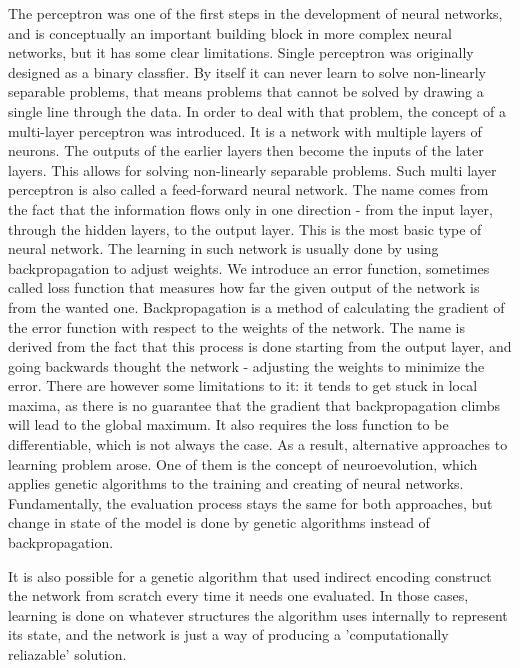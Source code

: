 \documentclass{article}
\begin{document}
The perceptron was one of the first steps in the development of neural networks, and is conceptually an important building block in more 
complex neural networks, but it has some clear limitations.
Single perceptron was originally designed as a binary classfier. 
By itself it can never learn to solve non-linearly
separable problems, that means problems that cannot be solved by drawing a single line through the data.
In order to deal with that problem, the concept of a multi-layer perceptron was introduced.
It is a network with multiple layers of neurons.
The outputs of the earlier layers then become the inputs of the later layers.
This allows for solving non-linearly separable problems. Such multi layer perceptron is also called a feed-forward neural network.
The name comes from the fact that the information flows only in one direction - from the input layer, through the hidden layers,
to the output layer. This is the most basic type of neural network. 
The learning in such network is usually done by using backpropagation to adjust weights. 
We introduce an error function, sometimes called loss function that measures how far the given output of the network is from the wanted one.
Backpropagation is a method of calculating the gradient of the error function with respect to the weights of the network. The name is derived from the fact that
this process is done starting from the output layer, and going backwards thought the network - adjusting the weights to minimize the error.
There are however some limitations to it: it tends to get stuck in local maxima, as there is no guarantee that the gradient that backpropagation climbs
will lead to the global maximum. It also requires the loss function to be differentiable, which is not always the case. As a result, alternative approaches
to learning problem arose. One of them is the concept of neuroevolution, which applies genetic algorithms to the training and creating of neural networks. 
Fundamentally, the evaluation process stays the same for both approaches, but change in state of the model is done by genetic algorithms instead of backpropagation.

It is also possible for a genetic algorithm that used indirect encoding construct the network from scratch every time it needs one evaluated. In those cases, 
learning is done on whatever structures the algorithm uses internally to represent its state, and the network is just a way of producing a 'computationally reliazable' solution.
\end{document}
